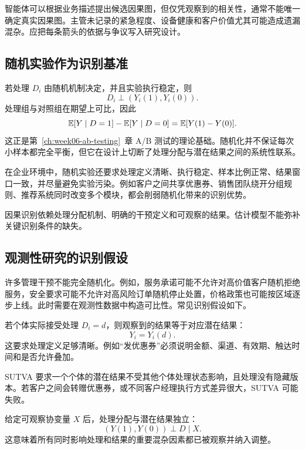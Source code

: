 智能体可以根据业务描述提出候选因果图，但仅凭观察到的相关性，通常不能唯一确定真实因果图。主管未记录的紧急程度、设备健康和客户价值尤其可能造成遗漏混杂。应把每条箭头的依据与争议写入研究设计。

\subsection{随机实验作为识别基准}

若处理 \(D_i\) 由随机机制决定，并且实验执行稳定，则
\[
  D_i\perp (Y_i(1),Y_i(0)).
\]
处理组与对照组在期望上可比，因此
\[
  \mathbb E[Y\mid D=1]-\mathbb E[Y\mid D=0]
  =
  \mathbb E[Y(1)-Y(0)].
\]
这正是第~\ref{ch:week06-ab-testing}~章 A/B 测试的理论基础。随机化并不保证每次小样本都完全平衡，但它在设计上切断了处理分配与潜在结果之间的系统性联系。

在企业环境中，随机实验还要求处理定义清晰、执行稳定、样本比例正常、结果窗口一致，并尽量避免实验污染。例如客户之间共享优惠券、销售团队绕开分组规则、推荐系统同时改变多个模块，都会削弱随机化带来的识别优势。

\begin{modernbox}[设计优先]
因果识别依赖处理分配机制、明确的干预定义和可观察的结果。估计模型不能弥补关键识别条件的缺失。
\end{modernbox}

\subsection{观测性研究的识别假设}
\label{sec:causal-assumptions}

许多管理干预不能完全随机化。例如，服务承诺可能不允许对高价值客户随机拒绝服务，安全要求可能不允许对高风险订单随机停止处置，价格政策也可能按区域逐步上线。此时需要在观测性数据中构造可比性。常见识别假设如下。

\begin{definition}[一致性]
若个体实际接受处理 \(D_i=d\)，则观察到的结果等于对应潜在结果：
\[
  Y_i=Y_i(d).
\]
这要求处理定义足够清晰。例如“发优惠券”必须说明金额、渠道、有效期、触达时间和是否允许叠加。
\end{definition}

\begin{definition}[SUTVA]
SUTVA 要求一个个体的潜在结果不受其他个体处理状态影响，且处理没有隐藏版本。若客户之间会转赠优惠券，或不同客户经理执行方式差异很大，SUTVA 可能失败。
\end{definition}

\begin{definition}[条件可交换性]
给定可观察协变量 \(X\) 后，处理分配与潜在结果独立：
\[
  (Y(1),Y(0))\perp D\mid X.
\]
这意味着所有同时影响处理和结果的重要混杂因素都已被观察并纳入调整。
\end{definition}

